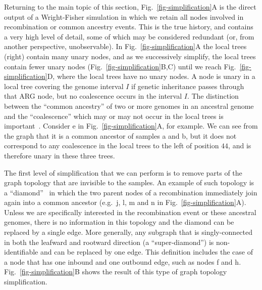 \documentclass{article}
\newcommand{\noderef}[1]{\textsf{#1}}
\begin{document}
Returning to the main topic of this section,
Fig.~\ref{fig-simplification}A is the direct output of a Wright-Fisher
simulation in which we retain all nodes involved in recombination
or common ancestry events. This is the true history, and contains
a very high level of detail, some of which may be considered
redundant (or, from another perspective, unobservable).
In Fig.~\ref{fig-simplification}A the local trees (right)
contain many unary nodes, and as we successively simplify,
the local trees contain fewer
unary nodes (Fig.~\ref{fig-simplification}B,C) until
we reach Fig.~\ref{fig-simplification}D, where the local trees
have no unary nodes.
A node is unary in a local tree covering the genome interval $I$
if genetic inheritance passes through that ARG node,
but no coalescence occurs in the interval $I$.
The distinction between the ``common ancestry'' of two or more genomes
in an ancestral genome and the ``coalescence'' which may or may
not occur in the local trees is
important~\citep{hudson1983testing,kelleher2016efficient}.
Consider \noderef{e} in Fig.~\ref{fig-simplification}A,
for example. We can see from the graph that it is a common
ancestor of samples \noderef{a} and \noderef{b}, but
it does not correspond to any coalescence in the
local trees to the left of position $44$, and is therefore
unary in these three trees.

The first level of simplification that we can perform is to remove
parts of the graph topology that are invisible to the samples.
An example of such topology is a
``diamond''~\citep{rasmussen2014genome}
in which the two parent nodes of a recombination immediately
join again into a common ancestor (e.g.~\noderef{j}, \noderef{l}, \noderef{m}
and \noderef{n} in Fig.~\ref{fig-simplification}A).
Unless we are specifically
interested in the recombination event or these ancestral genomes,
there is no information in this topology and the diamond can be
replaced by a single edge. More generally, any
subgraph that is singly-connected in both the leafward and
rootward direction (a ``super-diamond'') is non-identifiable and can be
replaced by one edge. This definition includes the case
of a node that has one inbound and one outbound edge, such as
nodes \noderef{f} and \noderef{h}.
Fig.~\ref{fig-simplification}B shows the result of this type of
graph topology simplification.
\end{document}
